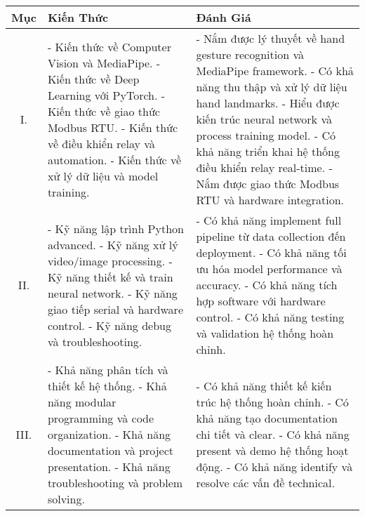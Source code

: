 \documentclass[12pt]{article}
\begin{document}
\begin{appendices}
\begin{enumerate}
\begin{longtable}{|c|p{7.5cm}|p{7cm}|}
\hline
\textbf{Mục} & \textbf{Kiến Thức} & \textbf{Đánh Giá} \\\hline
 I. & 
 - Kiến thức về Computer Vision và MediaPipe. \newline
 - Kiến thức về Deep Learning với PyTorch. \newline
 - Kiến thức về giao thức Modbus RTU. \newline
 - Kiến thức về điều khiển relay và automation. \newline
 - Kiến thức về xử lý dữ liệu và model training.
 & 
 - Nắm được lý thuyết về hand gesture recognition và MediaPipe framework. \newline
 - Có khả năng thu thập và xử lý dữ liệu hand landmarks. \newline
 - Hiểu được kiến trúc neural network và process training model. \newline
 - Có khả năng triển khai hệ thống điều khiển relay real-time. \newline
 - Nắm được giao thức Modbus RTU và hardware integration.
\\\hline
 II. &
 - Kỹ năng lập trình Python advanced. \newline
 - Kỹ năng xử lý video/image processing. \newline
 - Kỹ năng thiết kế và train neural network. \newline
 - Kỹ năng giao tiếp serial và hardware control. \newline
 - Kỹ năng debug và troubleshooting.
 &
 - Có khả năng implement full pipeline từ data collection đến deployment. \newline
 - Có khả năng tối ưu hóa model performance và accuracy. \newline
 - Có khả năng tích hợp software với hardware control. \newline
 - Có khả năng testing và validation hệ thống hoàn chỉnh.
\\\hline
 III. &
 - Khả năng phân tích và thiết kế hệ thống. \newline
 - Khả năng modular programming và code organization. \newline
 - Khả năng documentation và project presentation. \newline
 - Khả năng troubleshooting và problem solving.
 &
 - Có khả năng thiết kế kiến trúc hệ thống hoàn chỉnh. \newline
 - Có khả năng tạo documentation chi tiết và clear. \newline
 - Có khả năng present và demo hệ thống hoạt động. \newline
 - Có khả năng identify và resolve các vấn đề technical.
\\\hline
\end{longtable}

\end{enumerate}

\end{appendices}
\end{document}
